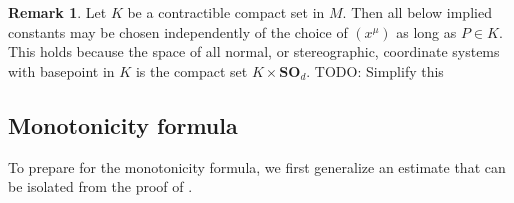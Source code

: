 \documentclass[reqno,10pt]{amsart}
\newcommand{\SpOrth}{\mathbf{SO}}
\theoremstyle{definition}
\newtheorem{remark}[theorem]{Remark}
\numberwithin{equation}{section}
\begin{document}
\begin{remark}\label{independence of constants}
Let $K$ be a contractible compact set in $M$.
Then all below implied constants may be chosen independently of the choice of $(x^\mu)$ as long as $P \in K$.
This holds because the space of all normal, or stereographic, coordinate systems with basepoint in $K$ is the compact set $K \times \SpOrth_d$. TODO: Simplify this
\end{remark}

\subsection{Monotonicity formula}
To prepare for the monotonicity formula, we first generalize an estimate that can be isolated from the proof of \cite[Lemma 5.8]{Giusti77}.
\end{document}
